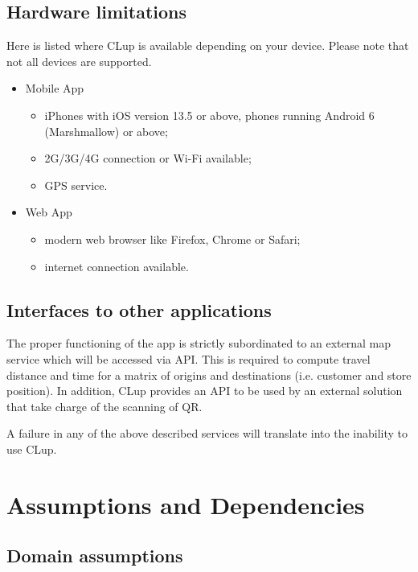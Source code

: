 \subsection{Hardware limitations}
 Here is listed where CLup is available depending on your device. Please note that not all devices are supported.
\begin{itemize}
	\item Mobile App
		\begin{itemize}
			\item iPhones with iOS version 13.5 or above, phones running Android 6 (Marshmallow) or above;
			\item 2G/3G/4G connection or Wi-Fi available;
			\item GPS service.
		\end{itemize}
	\item Web App
		\begin{itemize}
			\item modern web browser like Firefox, Chrome or Safari;
			\item internet connection available.
		\end{itemize}
\end{itemize}

\subsection{Interfaces to other applications}
The proper functioning of the app is strictly subordinated to an external map service which will be accessed via API. This is required to compute travel distance and time for a matrix of origins and destinations (i.e. customer and store position).\newline
In addition, CLup provides an API to be used by an external solution that take charge of the scanning of QR.

A failure in any of the above described services will translate into the inability to use CLup.

\section{Assumptions and Dependencies}

\subsection{Domain assumptions}
